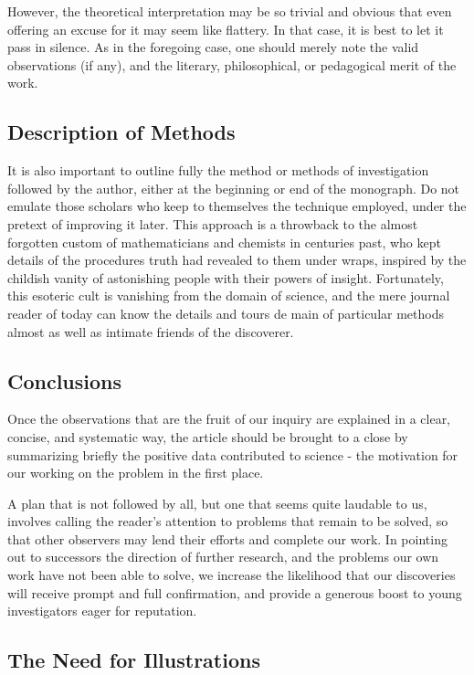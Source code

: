 \documentclass{article}
\begin{document}
However, the theoretical interpretation may be so trivial and obvious that even offering an excuse for it may seem like flattery. In that case, it is best to let it pass in silence. As in the foregoing case, one should merely note the valid observations (if any), and the literary, philosophical, or pedagogical merit of the work.

\subsection*{Description of Methods}

It is also important to outline fully the method or methods of investigation followed by the author, either at the beginning or end of the monograph. Do not emulate those scholars who keep to themselves the technique employed, under the pretext of improving it later. This approach is a throwback to the almost forgotten custom of mathematicians and chemists in centuries past, who kept details of the procedures truth had revealed to them under wraps, inspired by the childish vanity of astonishing people with their powers of insight. Fortunately, this esoteric cult is vanishing from the domain of science, and the mere journal reader of today can know the details and tours de main of particular methods almost as well as intimate friends of the discoverer.

\subsection*{Conclusions}

Once the observations that are the fruit of our inquiry are explained in a clear, concise, and systematic way, the article should be brought to a close by summarizing briefly the positive data contributed to science - the motivation for our working on the problem in the first place.

A plan that is not followed by all, but one that seems quite laudable to us, involves calling the reader’s attention to problems that remain to be solved, so that other observers may lend their efforts and complete our work. In pointing out to successors the direction of further research, and the problems our own work have not been able to solve, we increase the likelihood that our discoveries will receive prompt and full confirmation, and provide a generous boost to young investigators eager for reputation.

\subsection*{The Need for Illustrations}
\end{document}
